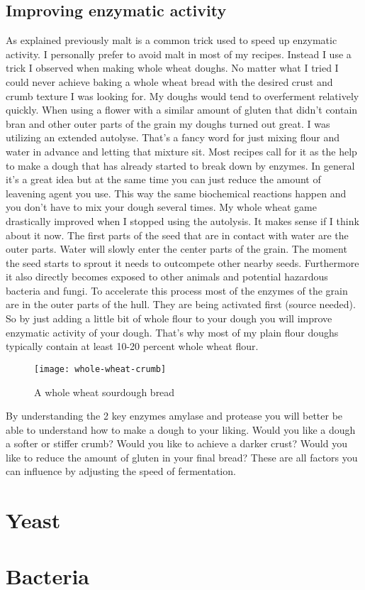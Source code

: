 \subsection{Improving enzymatic activity}

As explained previously malt is a common trick used
to speed up enzymatic activity. I personally prefer
to avoid malt in most of my recipes. Instead I use
a trick I observed when making whole wheat doughs.
No matter what I tried I could never achieve baking
a whole wheat bread with the desired crust and crumb
texture I was looking for. My doughs would tend to
overferment relatively quickly. When using a flower
with a similar amount of gluten that didn't contain
bran and other outer parts of the grain my doughs turned
out great. I was utilizing an extended autolyse.
That's a fancy word for just mixing flour and water in
advance and letting that mixture sit. Most recipes
call for it as the help to make a dough that has already
started to break down by enzymes. In general it's a great
idea but at the same time you can just reduce the amount
of leavening agent you use. This way the same biochemical
reactions happen and you don't have to mix your dough
several times. My whole wheat game drastically improved
when I stopped using the autolysis. It makes sense if I
think about it now. The first parts of the seed that
are in contact with water are the outer parts. Water
will slowly enter the center parts of the grain. The
moment the seed starts to sprout it needs to outcompete
other nearby seeds. Furthermore it also directly becomes
exposed to other animals and potential hazardous bacteria
and fungi. To accelerate this process most of the enzymes
of the grain are in the outer parts of the hull. They
are being activated first (source needed). So by just
adding a little bit of whole flour to your dough you 
will improve enzymatic activity of your dough. That's
why most of my plain flour doughs typically contain
at least 10-20 percent whole wheat flour.

\begin{figure}
  \texttt{[image: whole-wheat-crumb]}
  \caption{A whole wheat sourdough bread}
  \label{whole-wheat-crumb}
\end{figure}


By understanding the 2 key enzymes amylase and protease
you will better be able to understand how to make a
dough to your liking. Would you like a dough a softer
or stiffer crumb? Would you like to achieve a darker crust?
Would you like to reduce the amount of gluten in your
final bread? These are all factors you can influence
by adjusting the speed of fermentation.


\section{Yeast}
\section{Bacteria}